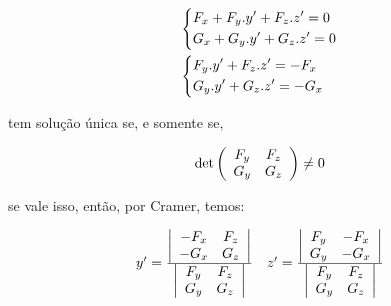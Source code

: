 \documentclass[11pt, oneside, a4paper]{gsm-l}
\begin{document}
\begin{sol}
\[
\begin{gathered}
\left\{ \begin{gathered}
F_x  + F_y .y' + F_z .z' = 0 \hfill \\
G_x  + G_y .y' + G_z .z' = 0 \hfill \\
\end{gathered}  \right. \hfill \\
\left\{ \begin{gathered}
F_y .y' + F_z .z' =  - F_x  \hfill \\
G_y .y' + G_z .z' =  - G_x  \hfill \\
\end{gathered}  \right. \hfill \\
\end{gathered}
\]

tem solução \'unica se, e somente se,

\[
\det \left( {\begin{array}{*{20}c}
{F_y } & {F_z }  \\
{G_y } & {G_z }  \\

\end{array} } \right) \ne 0
\]

se vale isso, então, por Cramer, temos:

\[
\begin{array}{*{20}c}
{y' = \frac{{\left| {\begin{array}{*{20}c}
{ - F_x } & {F_z }  \\
{ - G_x } & {G_z }  \\

\end{array} } \right|}}
{{\left| {\begin{array}{*{20}c}
{F_y } & {F_z }  \\
{G_y } & {G_z }  \\

\end{array} } \right|}}} & {z' = \frac{{\left| {\begin{array}{*{20}c}
{F_y } & { - F_x }  \\
{G_y } & { - G_x }  \\

\end{array} } \right|}}
{{\left| {\begin{array}{*{20}c}
{F_y } & {F_z }  \\
{G_y } & {G_z }  \\

\end{array} } \right|}}}  \\

\end{array}
\]

\end{sol}
\end{document}
